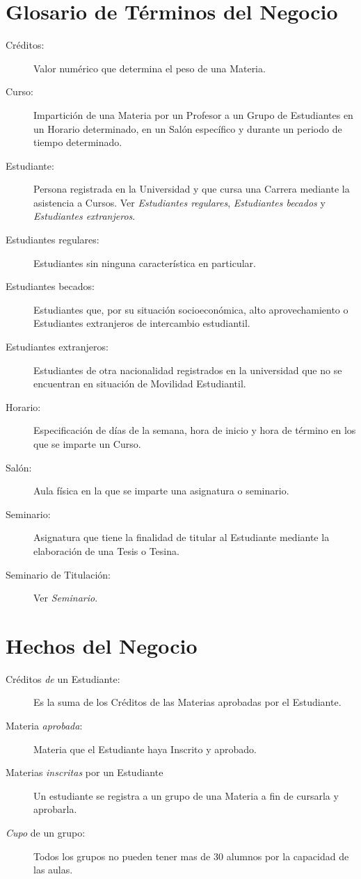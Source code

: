 \section{Glosario de Términos del Negocio}

\begin{description}
	\item[Créditos:] Valor numérico que determina el peso de una Materia.
	\item[Curso:] Impartición de una Materia por un Profesor a un Grupo de Estudiantes en un Horario determinado, en un Salón específico y durante un periodo de tiempo determinado.
	\item[Estudiante:] Persona registrada en la Universidad y que cursa una Carrera mediante la asistencia a Cursos. Ver {\em Estudiantes regulares}, {\em Estudiantes becados} y {\em Estudiantes extranjeros}.
	\item[Estudiantes regulares:] Estudiantes sin ninguna característica en particular.
	\item[Estudiantes becados:] Estudiantes que, por su situación socioeconómica, alto aprovechamiento o Estudiantes extranjeros de intercambio estudiantil.
	\item[Estudiantes extranjeros:] Estudiantes de otra nacionalidad registrados en la universidad que no se encuentran en situación de Movilidad Estudiantil.
	\item[Horario:] Especificación de días de la semana, hora de inicio y hora de término en los que se imparte un Curso.
	\item[Salón:] Aula física en la que se imparte una asignatura o seminario.
	\item[Seminario:] Asignatura que tiene la finalidad de titular al Estudiante mediante la elaboración de una Tesis o Tesina.
	\item[Seminario de Titulación:] Ver {\em Seminario}.
\end{description}

\section{Hechos del Negocio}

\begin{description}
	\item[Créditos {\em de} un Estudiante:] Es la suma de los Créditos de las Materias aprobadas por el Estudiante.
	\item[Materia {\em aprobada}:] Materia que el Estudiante haya Inscrito y aprobado.
	\item[Materias {\em inscritas} por un Estudiante] Un estudiante se registra a un grupo de una Materia a fin de cursarla y aprobarla.
	\item[{\em Cupo} de un grupo:] Todos los grupos no pueden tener mas de 30 alumnos por la capacidad de las aulas.
\end{description}

